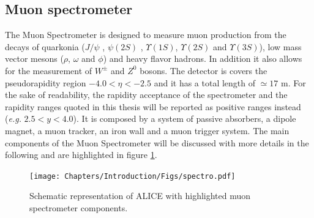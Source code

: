 \subsection{Muon spectrometer}
\label{ALICE_spectrometer}
The Muon Spectrometer is designed to measure muon production from the decays of quarkonia ($J/\psi$ , $\psi(2S)$ , $\Upsilon(1S)$, $\Upsilon(2S)$ and $\Upsilon(3S)$), low mass vector mesons ($\rho$, $\omega$ and $\phi$) and heavy flavor hadrons.
In addition it also allows for the measurement of $W^\pm$ and $Z^0$ bosons. 
The detector is covers the pseudorapidity region $-4.0 < \eta < -2.5$ and it has a total length of $\simeq 17$ m.
For the sake of readability, the rapidity acceptance of the spectrometer and the rapidity ranges quoted in this thesis will be reported as positive ranges instead (\textit{e.g.} $2.5 < y < 4.0$).
It is composed by a system of passive absorbers, a dipole magnet, a muon tracker, an iron wall and a muon trigger system. 
The main components of the Muon Spectrometer will be discussed with more details in the following and are highlighted in figure \ref{fig:spectro}.

\begin{figure}[!h]
\begin{center}
\texttt{[image: Chapters/Introduction/Figs/spectro.pdf]}
\caption{Schematic representation of ALICE with highlighted muon spectrometer components.}
\label{fig:spectro}
\end{center}
\end{figure}

